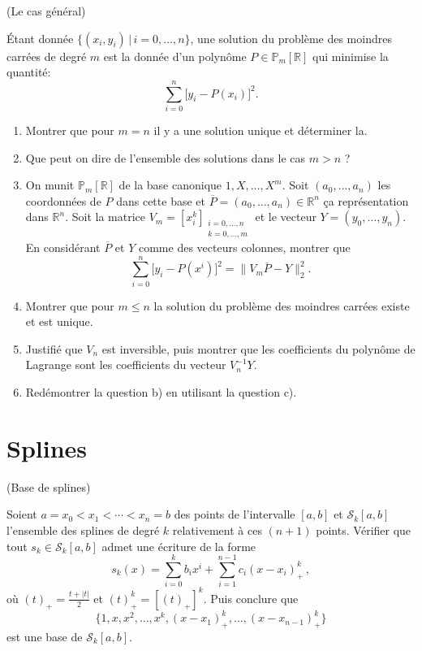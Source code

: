 \documentclass[a4paper,12pt,reqno]{amsart}
\begin{document}
\begin{exo} (Le cas général)

  Étant donnée $\{(x_{i} ,y_{i}) \,|\, i = 0,\ldots,n\}$, une solution du problème des moindres carrées de degré $m$ est la donnée d'un polynôme $P \in \mathbb{P}_{m}[\mathbb{R}]$ qui minimise la quantité:
    $$
        \sum_{i=0}^{n} \big[y_{i} - P(x_{i})\big]^{2}.
    $$

  \begin{enumerate}
    \item Montrer que pour $m=n$ il y a une solution unique et déterminer la.
    \item Que peut on dire de l'ensemble des solutions dans le cas $m>n$ ?
    \item On munit $\mathbb{P}_{m}[\mathbb{R}]$ de la base canonique $1,X,\ldots,X^{m}$. Soit $(a_{0},\ldots,a_{n})$ les coordonnées de $P$ dans cette base et $\overline{P}=(a_{0},\ldots,a_{n}) \in \mathbb{R}^{n}$ ça représentation dans $\mathbb{R}^{n}$. Soit la matrice $V_{m}=\left[x_{i}^{k}\right]_{\substack{i=0,\ldots,n\\ k=0,\ldots,m}}$ et le vecteur $Y=(y_{0},\ldots,y_{n})$. En considérant $\overline{P}$ et $Y$ comme des vecteurs colonnes, montrer que
      $$
        \sum_{i=0}^{n} \big[y_{i} - P(x^{i})\big]^{2} = \big\| V_{m}\overline{P}-Y \big\|_{2}^{2}.
      $$
    \item Montrer que pour $m \leq n$ la solution du problème des moindres carrées existe et est unique.
    \item Justifié que $V_{n}$ est inversible, puis montrer que les coefficients du polynôme de Lagrange sont les coefficients du vecteur $V_{n}^{-1}Y$.
    \item Redémontrer la question b) en utilisant la question c).
  \end{enumerate}
\end{exo}


\section{Splines}

\begin{exo} (Base de splines)

  Soient $a=x_0 < x_1 < \cdots < x_{n}=b$ des points de l'intervalle $[a,b]$ et $\mathcal{S}_{k}[a,b]$ l'ensemble des splines de degré $k$ relativement à ces $(n+1)$ points. Vérifier que tout $s_{k} \in \mathcal{S}_{k}[a,b]$ admet une écriture de la forme
  $$
    s_{k}(x) = \sum_{i=0}^{k} b_{i}x^{i} + \sum_{i=1}^{n-1} c_{i}(x - x_{i})_{+}^{k}\,,
  $$
  où $(t)_{+}=\frac{t+|t|}{2}$ et $(t)_{+}^{k}=\left[(t)_{+}\right]^{k}$. Puis conclure que
    $$
      \{1,x,x^{2},\ldots,x^{k},(x-x_{1})_{+}^{k},\ldots,(x-x_{n-1})_{+}^{k}\}
    $$
  est une base de $\mathcal{S}_{k}[a,b]$.
\end{exo}
\end{document}

